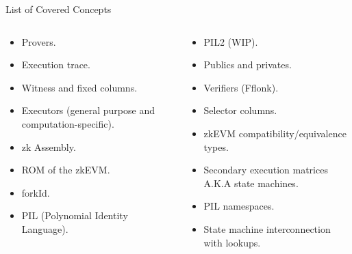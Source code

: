 \ifARCHMAP
\begin{frame}{List of Covered Concepts}
\begin{columns}
\begin{column}{0.48\textwidth}
\begin{itemize}
\item Provers. \hfill \CheckedBox
\item Execution trace. \hfill \CheckedBox
\item Witness and fixed columns. \hfill \CheckedBox
\item Executors (general purpose and computation-specific). \hfill \CheckedBox
\item zk Assembly. \hfill \CheckedBox
\item ROM of the zkEVM. \hfill \CheckedBox
\item forkId. \hfill \CheckedBox
\item PIL (Polynomial Identity Language). \hfill \CheckedBox
\end{itemize}
\end{column}
\begin{column}{0.48\textwidth}
\begin{itemize}
\item PIL2 (WIP). \hfill \CheckedBox
\item Publics and privates. \hfill \CheckedBox
\item Verifiers (Fflonk). \hfill \CheckedBox
\item Selector columns. \hfill \CheckedBox
\item zkEVM compatibility/equivalence types. \hfill \CheckedBox
\item Secondary execution matrices A.K.A state machines. \hfill \CheckedBox
\item PIL namespaces. \hfill \CheckedBox
\item State machine interconnection with lookups. \hfill \CheckedBox
\end{itemize}
\end{column}
\end{columns}
\end{frame}
\fi

